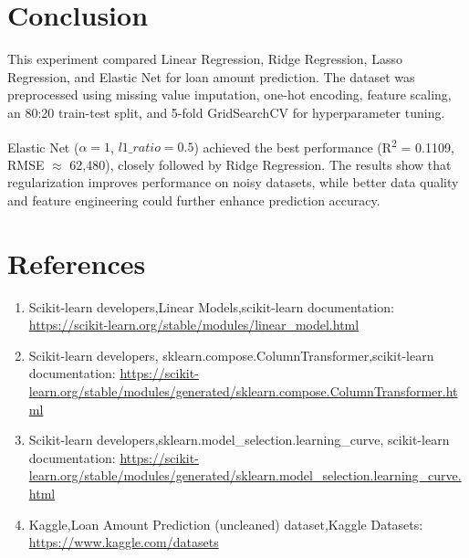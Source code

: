 \documentclass[12pt,a4paper]{article}
\begin{document}
\section{Conclusion}
This experiment compared Linear Regression, Ridge Regression, Lasso Regression, and Elastic Net for loan amount prediction. The dataset was preprocessed using missing value imputation, one-hot encoding, feature scaling, an 80:20 train-test split, and 5-fold GridSearchCV for hyperparameter tuning.

Elastic Net ($\alpha = 1$, $l1\_ratio = 0.5$) achieved the best performance (R\textsuperscript{2} = 0.1109, RMSE $\approx$ 62,480), closely followed by Ridge Regression. The results show that regularization improves performance on noisy datasets, while better data quality and feature engineering could further enhance prediction accuracy.

\section{References}
\begin{enumerate}
\item Scikit-learn developers,Linear Models,scikit-learn documentation: \url{https://scikit-learn.org/stable/modules/linear_model.html}
\item Scikit-learn developers, sklearn.compose.ColumnTransformer,scikit-learn documentation: \url{https://scikit-learn.org/stable/modules/generated/sklearn.compose.ColumnTransformer.html}
\item Scikit-learn developers,sklearn.model\_selection.learning\_curve, scikit-learn documentation: \url{https://scikit-learn.org/stable/modules/generated/sklearn.model_selection.learning_curve.html}
\item Kaggle,Loan Amount Prediction (uncleaned) dataset,Kaggle Datasets: \url{https://www.kaggle.com/datasets}
\end{enumerate}
\end{document}
